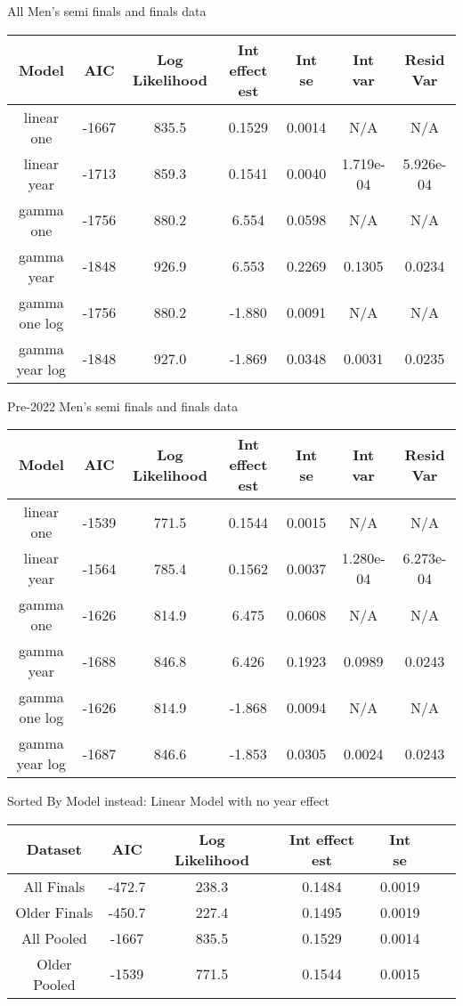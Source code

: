 \documentclass[12pt, letterpaper, titlepage]{article}
\begin{document}
All Men's semi finals and finals data
\begin{center}
  \begin{tabular}{|c | c | c | c | c | c | c |} 
   \hline
   Model & AIC & Log Likelihood & Int effect est & Int se & Int var & Resid Var \\ [0.5ex] 
   \hline\hline
   linear one & -1667 & 835.5 & 0.1529 & 0.0014 & N/A & N/A \\
   \hline
   linear year & -1713 & 859.3 & 0.1541 & 0.0040 & 1.719e-04 & 5.926e-04 \\ 
   \hline
   gamma one & -1756 & 880.2 & 6.554 & 0.0598 & N/A & N/A \\
   \hline
   gamma year & -1848 & 926.9 & 6.553 & 0.2269 & 0.1305 & 0.0234 \\
   \hline
   gamma one log & -1756 & 880.2 & -1.880 & 0.0091 & N/A & N/A \\
   \hline
   gamma year log & -1848 & 927.0 & -1.869 & 0.0348 & 0.0031 & 0.0235 \\ [0.5ex]
   \hline
  \end{tabular}
  \end{center}

Pre-2022 Men's semi finals and finals data
\begin{center}
  \begin{tabular}{|c | c | c | c | c | c | c |} 
   \hline
   Model & AIC & Log Likelihood & Int effect est & Int se & Int var & Resid Var \\ [0.5ex] 
   \hline\hline
   linear one & -1539 & 771.5 & 0.1544 & 0.0015 & N/A & N/A \\
   \hline
   linear year & -1564 & 785.4 & 0.1562 & 0.0037 & 1.280e-04 & 6.273e-04 \\ 
   \hline
   gamma one & -1626 & 814.9 & 6.475 & 0.0608 & N/A & N/A \\
   \hline
   gamma year & -1688 & 846.8 & 6.426 & 0.1923 & 0.0989 & 0.0243 \\
   \hline
   gamma one log & -1626 & 814.9 & -1.868 & 0.0094 & N/A & N/A \\
   \hline
   gamma year log & -1687 & 846.6 & -1.853 & 0.0305 & 0.0024 & 0.0243 \\ [0.5ex]
   \hline
  \end{tabular}
  \end{center}



Sorted By Model instead:
Linear Model with no year effect
\begin{center}
  \begin{tabular}{|c | c | c | c | c | c | c |} 
   \hline
   Dataset & AIC & Log Likelihood & Int effect est & Int se \\ [0.5ex] 
   \hline\hline
   All Finals & -472.7 & 238.3 & 0.1484 & 0.0019 \\
   \hline
   Older Finals & -450.7 & 227.4 & 0.1495 & 0.0019 \\ 
   \hline
   All Pooled & -1667 & 835.5 & 0.1529 & 0.0014 \\
   \hline
   Older Pooled & -1539 & 771.5 & 0.1544 & 0.0015 \\
   \hline
  \end{tabular}
  \end{center}
\end{document}

